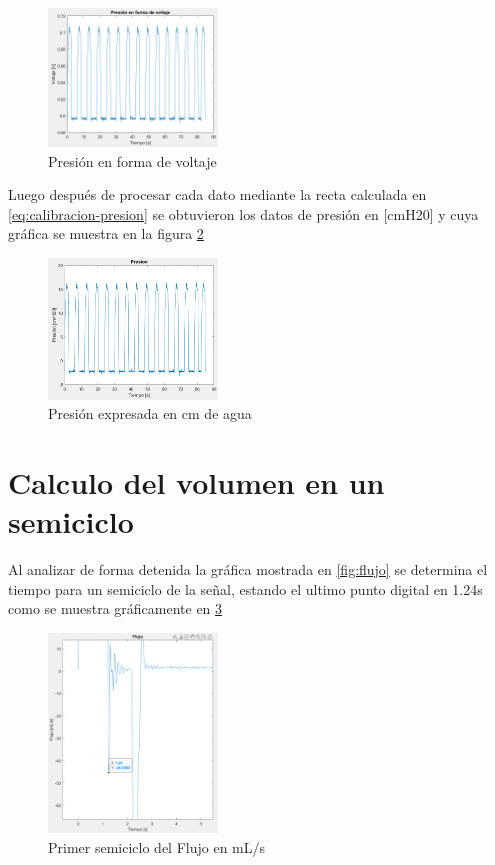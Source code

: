 \documentclass[conference]{IEEEtran}
\begin{document}
	\begin{figure}[h]
		\centering
		\includegraphics[width=0.4\textwidth]{media/presion-voltaje}
		\caption{Presión en forma de voltaje}
		\label{fig:presion-voltaje}
	\end{figure}
	
	Luego después de procesar cada dato mediante la recta calculada en \ref{eq:calibracion-presion} se obtuvieron los datos de presión en [cmH20] y cuya gráfica se muestra en la figura \ref{fig:presion}
	
	\begin{figure}[h]
		\centering
		\includegraphics[width=0.4\textwidth]{media/presion}
		\caption{Presión expresada en cm de agua}
		\label{fig:presion}
	\end{figure}
	
	\section{Calculo del volumen en un semiciclo}
	
	Al analizar de forma detenida la gráfica mostrada en \ref{fig:flujo} se determina el tiempo para un semiciclo de la señal, estando el ultimo punto digital en 1.24s como se muestra gráficamente en \ref{fig:semiciclo-flujo} 
	
	\begin{figure}[h]
		\centering
		\includegraphics[width=0.4\textwidth]{media/semiciclo-flujo}
		\caption{Primer semiciclo del Flujo en mL/s}
		\label{fig:semiciclo-flujo}
	\end{figure}
	
\end{document}
